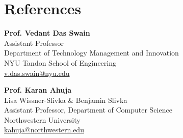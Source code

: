\documentclass[11pt,letterpaper]{article}
\begin{document}
\section{References}
{\small
\begin{minipage}[t]{0.48\linewidth}
\textbf{Prof. Vedant Das Swain} \\
Assistant Professor \\
Department of Technology Management and Innovation \\
NYU Tandon School of Engineering \\
\href{mailto:v.das.swain@nyu.edu}{v.das.swain@nyu.edu}
\end{minipage}\hfill
\begin{minipage}[t]{0.48\linewidth}
\textbf{Prof. Karan Ahuja} \\
Lisa Wissner-Slivka \& Benjamin Slivka \\
Assistant Professor, Department of Computer Science \\
Northwestern University \\
\href{mailto:kahuja@northwestern.edu}{kahuja@northwestern.edu}
\end{minipage}
\par}
\end{document}
